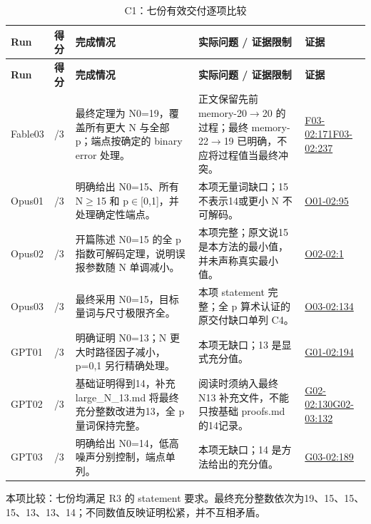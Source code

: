 \documentclass[11pt,a4paper]{article}
\begin{document}
{\fontsize{9.0}{12.6}\selectfont
\setlength{\tabcolsep}{2.5pt}
\begin{longtable}{>{\raggedright\arraybackslash}p{}>{\raggedright\arraybackslash}p{}>{\raggedright\arraybackslash}p{}>{\raggedright\arraybackslash}p{}>{\raggedright\arraybackslash}p{}}
\caption{C1：七份有效交付逐项比较}\\
\toprule
\textbf{Run} & \textbf{得分} & \textbf{完成情况} & \textbf{实际问题 / 证据限制} & \textbf{证据}\tabularnewline
\midrule
\endfirsthead
\toprule
\textbf{Run} & \textbf{得分} & \textbf{完成情况} & \textbf{实际问题 / 证据限制} & \textbf{证据}\tabularnewline
\midrule
\endhead
{}Fable03 & 3/3 & 最终定理为 N0=19，覆盖所有更大 N 与全部 p；端点按确定的 binary error 处理。 & 正文保留先前 memory-20\ensuremath{\rightarrow}20 的过程；最终 memory-22\ensuremath{\rightarrow}19 已明确，不应将过程值当最终冲突。 & \hyperref[src:F03-02]{F03-02:171}\newline \hyperref[src:F03-02]{F03-02:237}\tabularnewline
{}Opus01 & 3/3 & 明确给出 N0=15、所有 N\ensuremath{\geq}15 和 p\ensuremath{\in}[0,1]，并处理确定性端点。 & 本项无量词缺口；15 不表示14或更小 N 不可解码。 & \hyperref[src:O01-02]{O01-02:95}\tabularnewline
{}Opus02 & 3/3 & 开篇陈述 N0=15 的全 p 指数可解码定理，说明误报参数随 N 单调减小。 & 本项完整；原文说15是本方法的最小值，并未声称真实最小值。 & \hyperref[src:O02-02]{O02-02:1}\tabularnewline
{}Opus03 & 3/3 & 最终采用 N0=15，目标量词与尺寸极限齐全。 & 本项 statement 完整；全 p 算术认证的原交付缺口单列 C4。 & \hyperref[src:O03-02]{O03-02:134}\tabularnewline
{}GPT01 & 3/3 & 明确证明 N0=13；N 更大时路径因子减小，p=0,1 另行精确处理。 & 本项无缺口；13 是显式充分值。 & \hyperref[src:G01-02]{G01-02:194}\tabularnewline
{}GPT02 & 3/3 & 基础证明得到14，补充 large\_N\_13.md 将最终充分整数改进为13，全 p 量词保持完整。 & 阅读时须纳入最终 N13 补充文件，不能只按基础 proofs.md 的14记录。 & \hyperref[src:G02-02]{G02-02:130}\newline \hyperref[src:G02-03]{G02-03:132}\tabularnewline
{}GPT03 & 3/3 & 明确给出 N0=14，低高噪声分别控制，端点单列。 & 本项无缺口；14 是方法给出的充分值。 & \hyperref[src:G03-02]{G03-02:189}\tabularnewline
\bottomrule
\end{longtable}
}
本项比较：七份均满足 R3 的 statement 要求。最终充分整数依次为19、15、15、15、13、13、14；不同数值反映证明松紧，并不互相矛盾。
\end{document}
